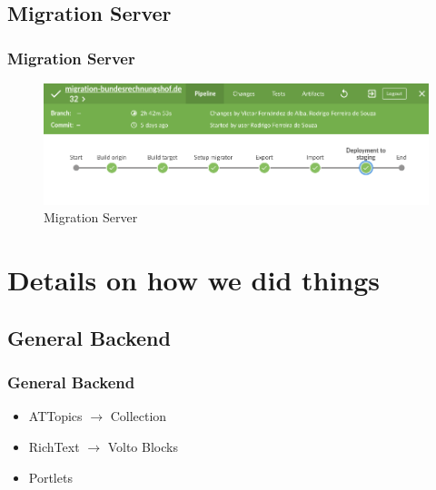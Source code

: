 \documentclass[aspectratio=169]{beamer}
\begin{document}
\subsection{Migration Server}
\begin{frame}
  \frametitle{Migration Server}
  \begin{figure}
    \includegraphics[width=\textwidth]{./img/008_-_Migration.png}
    \caption{Migration Server}
  \end{figure}
\end{frame}


\section{Details on how we did things}
\subsection{General Backend}
\begin{frame}
  \frametitle{General Backend}
  \begin{itemize}
    \item ATTopics $\rightarrow$ Collection \pause
    \item RichText $\rightarrow$ Volto Blocks \pause
    \item Portlets
  \end{itemize}
\end{frame}
\end{document}

